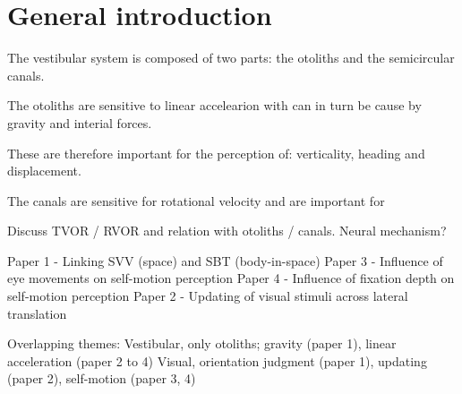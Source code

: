 \chapter{General introduction}
\newpage


The vestibular system is composed of two parts: the otoliths and the semicircular canals.

The otoliths are sensitive to linear accelearion with can in turn be cause by gravity and interial forces.

These are therefore important for the perception of: verticality, heading and displacement.

The canals are sensitive for rotational velocity and are important for 


Discuss TVOR / RVOR and relation with otoliths / canals. Neural mechanism?


Paper 1 - Linking SVV (space) and SBT (body-in-space)
Paper 3 - Influence of eye movements on self-motion perception
Paper 4 - Influence of fixation depth on self-motion perception
Paper 2 - Updating of visual stimuli across lateral translation



Overlapping themes:
  Vestibular, only otoliths; gravity (paper 1), linear acceleration (paper 2 to 4)
  Visual, orientation judgment (paper 1), updating (paper 2), self-motion (paper 3, 4)
